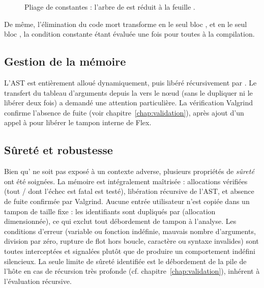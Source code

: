 \begin{figure}[ht]
\centering
{}
\hspace{1.5cm}
\hspace{1.5cm}
\caption{Pliage de constantes : l'arbre de  est réduit à la
feuille .}
\label{fig:fold}
\end{figure}

De même, l'élimination du code mort transforme 
en le seul bloc , et  en le seul bloc , la
condition constante étant évaluée une fois pour toutes à la compilation.

\subsection{Gestion de la mémoire}

L'AST est entièrement alloué dynamiquement, puis libéré récursivement par
. Le transfert du tableau d'arguments depuis la 
vers le n\oe ud (sans le dupliquer ni le libérer deux fois) a demandé une
attention particulière. La vérification Valgrind confirme l'absence de fuite (voir
chapitre~\ref{chap:validation}), après ajout d'un appel à 
pour libérer le tampon interne de Flex.

\subsection{Sûreté et robustesse}

Bien qu'\ilang{} ne soit pas exposé à un contexte adverse, plusieurs propriétés de
\emph{sûreté} ont été soignées. La mémoire est intégralement maîtrisée :
allocations vérifiées (tout / dont l'échec est fatal
est testé), libération récursive de l'AST, et absence de fuite confirmée par
Valgrind. Aucune entrée utilisateur n'est copiée dans un tampon de taille fixe :
les identifiants sont dupliqués par  (allocation dimensionnée), ce
qui exclut tout débordement de tampon à l'analyse. Les conditions d'erreur
(variable ou fonction indéfinie, mauvais nombre d'arguments, division par zéro,
rupture de flot hors boucle, caractère ou syntaxe invalides) sont toutes
interceptées et signalées plutôt que de produire un comportement indéfini
silencieux. La seule limite de sûreté identifiée est le débordement de la pile de
l'hôte en cas de récursion très profonde (cf. chapitre~\ref{chap:validation}),
inhérent à l'évaluation récursive.

